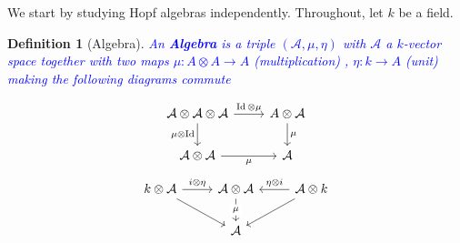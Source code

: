 \documentclass[11pt, a4paper]{article}
\DeclareMathOperator*{\id}{Id}
\newtheorem{defn}{Definition}
\theoremstyle{plain}
\begin{document}
We start by studying Hopf algebras independently. 
Throughout, let $k$ be a field.
\begin{defn}[Algebra]
	\textcolor{blue}{
	An \textbf{Algebra} is a triple $\left( \mathcal{A},\mu, \eta\right) $ with $\mathcal{A}$ a $k$-vector space together with two maps   $\mu\colon A\otimes A \to A$ (multiplication) , $\eta\colon k \to A$ (unit)  making the following diagrams commute}

\[\begin{tikzcd}
	{\mathcal{A} \otimes \mathcal{A}\otimes \mathcal{A}} & {A\otimes \mathcal{A}} \\
	{\mathcal{A}\otimes \mathcal{A}} & {\mathcal{A}}
	\arrow["\id\otimes\mu", from=1-1, to=1-2]
	\arrow["\mu", from=1-2, to=2-2]
	\arrow["\mu"', from=2-1, to=2-2]
	\arrow["{\mu\otimes \id}"', from=1-1, to=2-1]
\end{tikzcd}\]
\[\begin{tikzcd}
	{k\otimes \mathcal{A}} & {\mathcal{A}\otimes\mathcal{A}} & {\mathcal{A}\otimes k} \\
	& {\mathcal{A}}
	\arrow["{\eta\otimes i}"', from=1-3, to=1-2]
	\arrow["i\otimes\eta", from=1-1, to=1-2]
	\arrow[from=1-1, to=2-2]
	\arrow[from=1-3, to=2-2]
	\arrow["\mu"{description}, from=1-2, to=2-2]
\end{tikzcd}\]
\end{defn}
\end{document}
